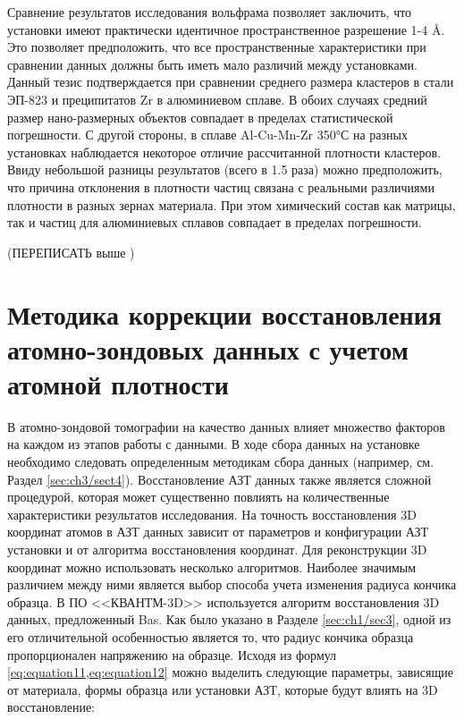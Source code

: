 Сравнение результатов исследования вольфрама позволяет заключить, что установки имеют практически идентичное пространственное разрешение 1-4 \r{A}. Это позволяет предположить, что все пространственные характеристики при сравнении данных должны быть иметь мало различий между установками. Данный тезис подтверждается при сравнении среднего размера кластеров в стали ЭП-823 и преципитатов Zr в алюминиевом сплаве. В обоих случаях средний размер нано-размерных объектов совпадает в пределах статистической погрешности. С другой стороны, в сплаве Al-Cu-Mn-Zr 350°С на разных установках наблюдается некоторое отличие рассчитанной плотности кластеров. Ввиду небольшой разницы результатов (всего в 1.5 раза) можно предположить, что причина отклонения в плотности частиц связана с реальными различиями плотности в разных зернах материала. При этом химический состав как матрицы, так и частиц для алюминиевых сплавов совпадает в пределах погрешности.

(ПЕРЕПИСАТЬ выше )

\FloatBarrier

\section{Методика коррекции восстановления атомно-зондовых данных с учетом атомной плотности}\label{sec:ch3/sect5}

В атомно-зондовой томографии на качество данных влияет множество факторов на каждом из этапов работы с данными. В ходе сбора данных на установке необходимо следовать определенным методикам сбора данных (например, см. Раздел \cref{sec:ch3/sect4}). Восстановление АЗТ данных также является сложной процедурой, которая может существенно повлиять на количественные характеристики результатов исследования. На точность восстановления 3D координат атомов в АЗТ данных зависит от параметров и конфигурации АЗТ установки и от алгоритма восстановления координат. Для реконструкции 3D координат можно использовать несколько алгоритмов. Наиболее значимым различием между ними является выбор способа учета изменения радиуса кончика образца. В ПО <<КВАНТМ-3D>> используется алгоритм восстановления 3D данных, предложенный Bas. Как было указано в Разделе \cref{sec:ch1/sec3}, одной из его отличительной особенностью является то, что радиус кончика образца пропорционален напряжению на образце. Исходя из формул \cref{eq:equation11,eq:equation12} можно выделить следующие параметры, зависящие от материала, формы образца или установки АЗТ, которые будут влиять на 3D восстановление:

